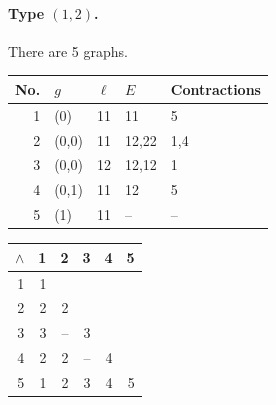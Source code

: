 \documentclass[11pt,a4paper]{article}
\theoremstyle{definition}
\begin{document}
\paragraph{Type $(1,2)$.} There are 5 graphs.
\begin{center}\small
\begin{tabular}{rllll}\toprule
No.&$g$&$\ell$&$E$&Contractions\\\midrule
1 & (0) & 11 & 11 & 5\\
2 & (0,0) & 11 & 12,22 & 1,4\\
3 & (0,0) & 12 & 12,12 & 1\\
4 & (0,1) & 11 & 12 & 5\\
5 & (1) & 11 & -- & --\\
\bottomrule\end{tabular}\end{center}
\begin{center}\scriptsize\setlength{\tabcolsep}{2pt}
\begin{tabular}{r|rrrrr}
$\wedge$&1&2&3&4&5\\\hline
1&1&&&&\\
2&2&2&&&\\
3&3&--&3&&\\
4&2&2&--&4&\\
5&1&2&3&4&5\\
\end{tabular}\end{center}
\end{document}
